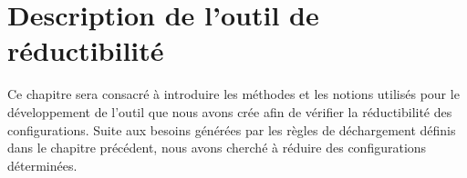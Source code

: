 \documentclass[10pt,a4paper]{article}
\begin{document}



\section{Description de l'outil de réductibilité}
\label{chap:Des}

Ce chapitre sera consacré à introduire les méthodes et les notions utilisés pour le développement de l'outil que nous avons crée afin de vérifier la réductibilité des configurations. Suite aux besoins générées par les règles de déchargement définis dans le chapitre précédent, nous avons cherché à réduire des configurations déterminées.

\end{document}
